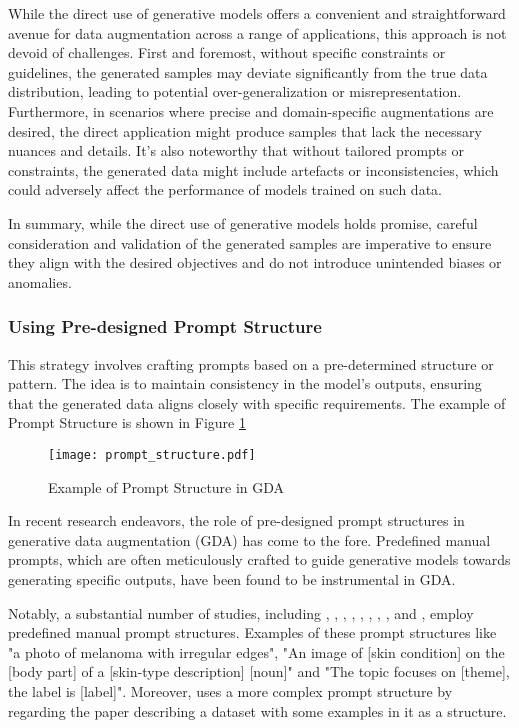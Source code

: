 \documentclass[preprint,12pt,authoryear]{elsarticle}
\begin{document}
While the direct use of generative models offers a convenient and straightforward avenue for data augmentation across a range of applications, this approach is not devoid of challenges. 
First and foremost, without specific constraints or guidelines, the generated samples may deviate significantly from the true data distribution, leading to potential over-generalization or misrepresentation. Furthermore, in scenarios where precise and domain-specific augmentations are desired, the direct application might produce samples that lack the necessary nuances and details. It's also noteworthy that without tailored prompts or constraints, the generated data might include artefacts or inconsistencies, which could adversely affect the performance of models trained on such data. 

In summary, while the direct use of generative models holds promise, careful consideration and validation of the generated samples are imperative to ensure they align with the desired objectives and do not introduce unintended biases or anomalies.

\subsubsection{Using Pre-designed Prompt Structure}
This strategy involves crafting prompts based on a pre-determined structure or pattern. The idea is to maintain consistency in the model's outputs, ensuring that the generated data aligns closely with specific requirements. The example of Prompt Structure is shown in Figure \ref{fig:prompt_structure}

\begin{figure}
    \centering
    \centerline{\texttt{[image: prompt\_structure.pdf]}}
    \caption{Example of Prompt Structure in GDA\cite{118_prompt_structure} }
    \label{fig:prompt_structure}
\end{figure}

In recent research endeavors, the role of pre-designed prompt structures in generative data augmentation (GDA) has come to the fore. Predefined manual prompts, which are often meticulously crafted to guide generative models towards generating specific outputs, have been found to be instrumental in GDA.

Notably, a substantial number of studies, including \cite{110_prompt_structure}, \cite{111_prompt_structure}, \cite{112_prompt_structure}, \cite{113_prompt_structure}, \cite{114_prompt_structure}, \cite{116_prompt_structure}, \cite{117_prompt_structure}, \cite{118_prompt_structure},\cite{122_prompt_structure} and \cite{119_prompt_structure}, employ predefined manual prompt structures. Examples of these prompt structures like "a photo of melanoma with irregular edges", "An image of [skin condition] on the [body part] of a [skin-type description] [noun]" and "The topic focuses on [theme], the label is [label]". Moreover, \cite{134}uses a more complex prompt structure by regarding the paper  describing a dataset  with some examples in it as a structure.
\end{document}
